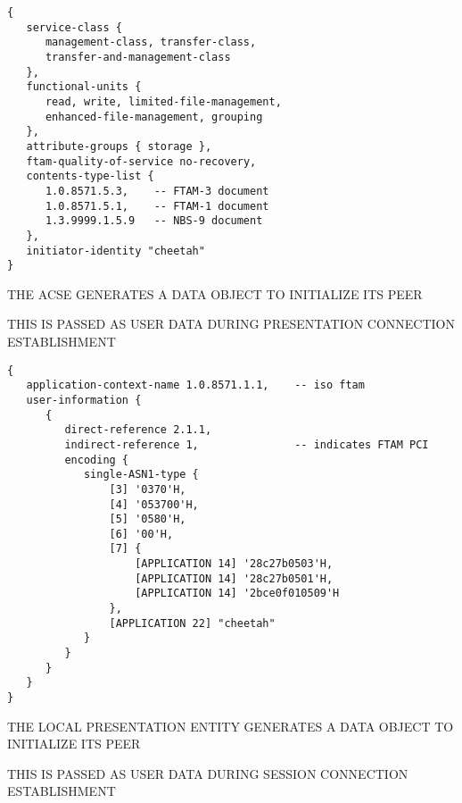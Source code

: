 \begin{bwslide}

\smaller
\begin{verbatim}
{
   service-class {
      management-class, transfer-class,
      transfer-and-management-class
   },
   functional-units {
      read, write, limited-file-management,
      enhanced-file-management, grouping
   },
   attribute-groups { storage },
   ftam-quality-of-service no-recovery,
   contents-type-list {
      1.0.8571.5.3,    -- FTAM-3 document
      1.0.8571.5.1,    -- FTAM-1 document
      1.3.9999.1.5.9   -- NBS-9 document
   },
   initiator-identity "cheetah"
}
\end{verbatim}
\end{bwslide}


\begin{bwslide}

\begin{nrtc}
\item	THE ACSE GENERATES A DATA OBJECT TO INITIALIZE ITS PEER

\item	THIS IS PASSED AS USER DATA DURING PRESENTATION CONNECTION
	ESTABLISHMENT 
\end{nrtc}
\end{bwslide}


\begin{bwslide}

\smaller
\begin{verbatim}
{
   application-context-name 1.0.8571.1.1,    -- iso ftam
   user-information {
      {
         direct-reference 2.1.1,
         indirect-reference 1,               -- indicates FTAM PCI
         encoding {
            single-ASN1-type {
                [3] '0370'H,
                [4] '053700'H,
                [5] '0580'H,
                [6] '00'H,
                [7] {
                    [APPLICATION 14] '28c27b0503'H,
                    [APPLICATION 14] '28c27b0501'H,
                    [APPLICATION 14] '2bce0f010509'H
                },
                [APPLICATION 22] "cheetah"
            }
         }
      }
   }
}
\end{verbatim}
\end{bwslide}


\begin{bwslide}

\begin{nrtc}
\item	THE LOCAL PRESENTATION ENTITY GENERATES A DATA OBJECT TO INITIALIZE
	ITS PEER

\item	THIS IS PASSED AS USER DATA DURING SESSION CONNECTION ESTABLISHMENT 
\end{nrtc}
\end{bwslide}


